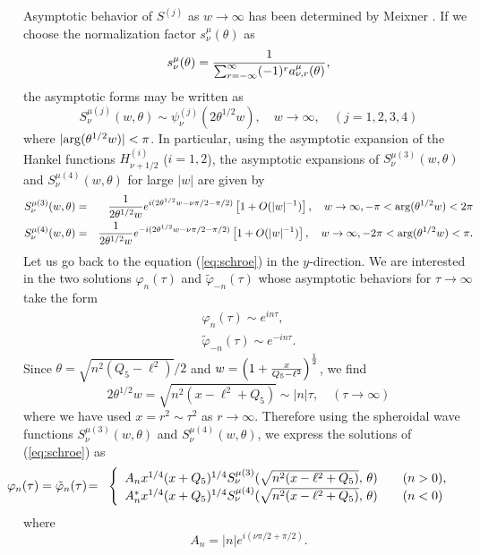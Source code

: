 \documentclass[a4paper,12pt]{article}
\begin{document}
Asymptotic behavior of $S^{(j)}$ as $w\rightarrow\infty$ has been 
determined by Meixner \cite{Er,MeSc}. 
If we choose the normalization factor $s^{\mu}_{\nu}(\theta)$ as
\begin{equation}
 s^{\mu}_{\nu}(\theta)={1\over \sum_{r=-\infty}^{\infty}(-1)^{r}
a^{\mu}_{\nu,r}(\theta)},
\end{equation}
the asymptotic forms may be written as
\begin{equation}
 S^{\mu(j)}_{\nu}(w,\theta)\sim \psi^{(j)}_{\nu}(2\theta^{1/2}w),
\quad w\rightarrow\infty, \quad (j=1,2,3,4)
\end{equation}
where $|{\rm arg}(\theta^{1/2}w)|<\pi$.
In particular, using the asymptotic expansion of the Hankel functions
$H^{(i)}_{\nu+1/2}$ ($i=1,2$), the asymptotic expansions of 
$S^{\mu (3)}_{\nu}(w,\theta)$
and
$S^{\mu (4)}_{\nu}(w,\theta)$ for large $|w|$ are given by
\begin{eqnarray}
 S^{\mu (3)}_{\nu}(w,\theta)&=&{1\over 2\theta^{1/2}w}
e^{i (2\theta^{1/2}w-\nu\pi/2-\pi/2)}\left[1+O(|w|^{-1})\right],\quad
w\rightarrow\infty, -\pi<{\rm arg}(\theta^{1/2}w)<2\pi\nonumber\\
 S^{\mu (4)}_{\nu}(w,\theta)&=&{1\over 2\theta^{1/2}w}
e^{-i (2\theta^{1/2}w-\nu\pi/2-\pi/2)}\left[1+O(|w|^{-1})\right],\quad
w\rightarrow\infty, -2\pi<{\rm arg}(\theta^{1/2}w)<\pi.\nonumber\\
\end{eqnarray}
Let us go back to the equation (\ref{eq:schroe}) in the
$y$-direction. 
We are interested in the two solutions $\varphi_{n}(\tau)$ and
$\tilde{\varphi}_{-n}(\tau)$
whose asymptotic behaviors for $\tau\rightarrow\infty$ 
take the form
\begin{eqnarray}
 \varphi_{n}(\tau)\sim e^{in\tau},\nonumber\\
 \tilde{\varphi}_{-n}(\tau)\sim e^{-in\tau}.
\label{eq:asympt}
\end{eqnarray}
Since $\theta=\sqrt{n^2(Q_{5}-\ell^2)}/2$ and 
$w=\left(1+{x\over Q_{5}-\ell^2}\right)^{1\over2}$, 
we find
\begin{equation}
2\theta^{1/2}w=\sqrt{n^2(x-\ell^2+Q_5)}\sim |n|\tau,
 \quad (\tau\rightarrow\infty)
\end{equation}
where we have used $x=r^2\sim \tau^2$ as
$r\rightarrow\infty$.
Therefore using the spheroidal wave functions
$S^{\mu (3)}_{\nu}(w,\theta)$
and
$S^{\mu (4)}_{\nu}(w,\theta)$, we express the solutions of 
(\ref{eq:schroe}) as
\begin{eqnarray}
\hspace*{-1cm}
 \varphi_{n}(\tau)=\tilde{\varphi}_{n}(\tau)&\!=\!&
\left\{
\begin{array}{l}
A_{n}x^{1/4}(x+Q_{5})^{1/4}
S^{\mu (3)}_{\nu}(\sqrt{n^2(x-\ell^2+Q_5)},\,\theta)
\qquad (n>0), \\
A_{n}^{\ast}x^{1/4}(x+Q_{5})^{1/4}
S^{\mu (4)}_{\nu}(\sqrt{n^2(x-\ell^2+Q_5)},\,\theta)\qquad (n<0)
\end{array}
\right. 
\label{eq:phis1}
\end{eqnarray}
where 
\begin{equation}
 A_{n}=|n|e^{i(\nu\pi/2+\pi/2)}.
\label{eq:AB}
\end{equation}
\end{document}
